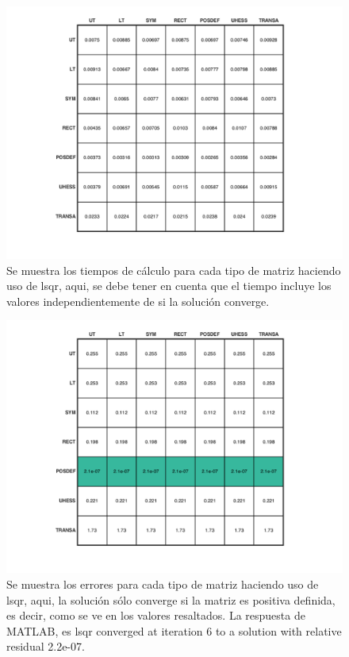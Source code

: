 \documentclass[11pt, spanish]{article}
\begin{document}
\begin{enumerate}
\begin{figure}[h]
\centering
	\includegraphics[scale=0.8]{data/img/plotlsqr_times}
	\caption{Se muestra los tiempos de cálculo para cada tipo de matriz haciendo uso de lsqr, aqui, se debe tener en cuenta que el tiempo incluye los valores independientemente de si la solución converge.}
\end{figure}

\newpage

\begin{figure}[h]
\centering
	\includegraphics[scale=0.8]{data/img/plotlsqr_error}
	\caption{Se muestra los errores para cada tipo de matriz haciendo uso de lsqr, aqui, la solución sólo converge si la matriz es positiva definida, es decir, como se ve en los valores resaltados. La respuesta de MATLAB, es lsqr converged at iteration 6 to a solution with relative residual 2.2e-07.}
\end{figure}


\end{enumerate}
\end{document}
